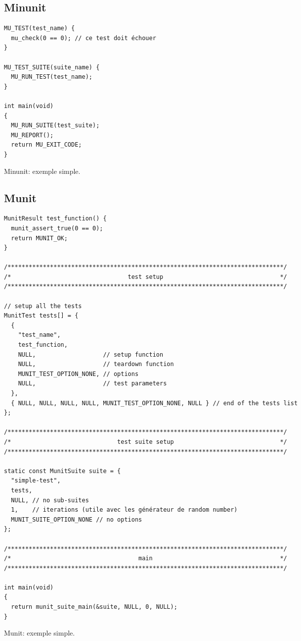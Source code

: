 \documentclass[a4paper]{article}
\begin{document}
\subsection*{Minunit}

\begin{listing}[ht!]
\begin{verbatim}
MU_TEST(test_name) {
  mu_check(0 == 0); // ce test doit échouer
}

MU_TEST_SUITE(suite_name) {
  MU_RUN_TEST(test_name);
}

int main(void)
{
  MU_RUN_SUITE(test_suite);
  MU_REPORT();
  return MU_EXIT_CODE;
}
\end{verbatim}
\caption{Minunit: exemple simple.}
\label{minunit-example}
\end{listing}

\clearpage{}
\subsection*{Munit}

\begin{listing}[ht!]
\begin{verbatim}
MunitResult test_function() {
  munit_assert_true(0 == 0);
  return MUNIT_OK;
}

/******************************************************************************/
/*                                 test setup                                 */
/******************************************************************************/

// setup all the tests
MunitTest tests[] = {
  {
    "test_name",
    test_function,
    NULL,                   // setup function
    NULL,                   // teardown function
    MUNIT_TEST_OPTION_NONE, // options
    NULL,                   // test parameters
  },
  { NULL, NULL, NULL, NULL, MUNIT_TEST_OPTION_NONE, NULL } // end of the tests list
};

/******************************************************************************/
/*                              test suite setup                              */
/******************************************************************************/

static const MunitSuite suite = {
  "simple-test",
  tests,
  NULL, // no sub-suites
  1,    // iterations (utile avec les générateur de random number)
  MUNIT_SUITE_OPTION_NONE // no options
};

/******************************************************************************/
/*                                    main                                    */
/******************************************************************************/

int main(void)
{
  return munit_suite_main(&suite, NULL, 0, NULL);
}
\end{verbatim}
\caption{Munit: exemple simple.}
\label{munit-example}
\end{listing}
\end{document}
